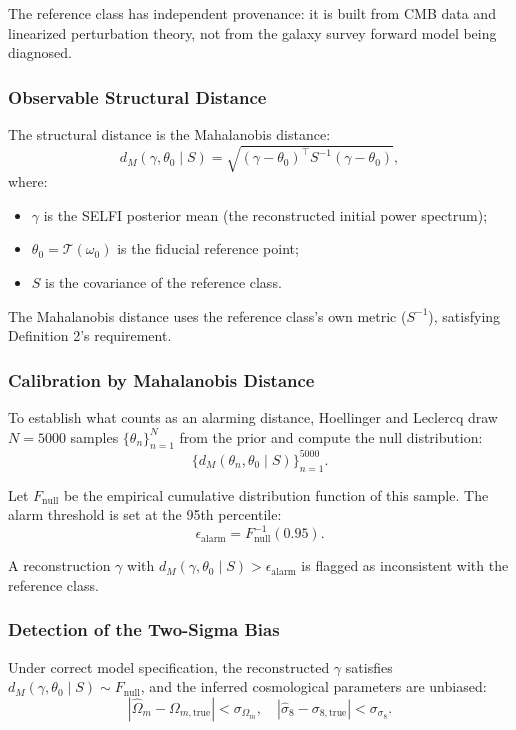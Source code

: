 The reference class has independent provenance: it is built from CMB data and linearized perturbation theory, not from the galaxy survey forward model being diagnosed.

\subsubsection{Observable Structural Distance}

The structural distance is the Mahalanobis distance:
\[
d_M(\gamma, \theta_0 \mid S) = \sqrt{(\gamma - \theta_0)^\top S^{-1} (\gamma - \theta_0)},
\]
where:
\begin{itemize}
\item $\gamma$ is the SELFI posterior mean (the reconstructed initial power spectrum);
\item $\theta_0 = \mathcal{T}(\omega_0)$ is the fiducial reference point;
\item $S$ is the covariance of the reference class.
\end{itemize}

The Mahalanobis distance uses the reference class's own metric ($S^{-1}$), satisfying Definition 2's requirement.

\subsubsection{Calibration by Mahalanobis Distance}

To establish what counts as an alarming distance, Hoellinger and Leclercq draw $N = 5000$ samples $\{\theta_n\}_{n=1}^N$ from the prior and compute the null distribution:
\[
\{d_M(\theta_n, \theta_0 \mid S)\}_{n=1}^{5000}.
\]

Let $F_{\mathrm{null}}$ be the empirical cumulative distribution function of this sample. The alarm threshold is set at the 95th percentile:
\[
\epsilon_{\mathrm{alarm}} = F_{\mathrm{null}}^{-1}(0.95).
\]

A reconstruction $\gamma$ with $d_M(\gamma, \theta_0 \mid S) > \epsilon_{\mathrm{alarm}}$ is flagged as inconsistent with the reference class.

\subsubsection{Detection of the Two-Sigma Bias}

Under correct model specification, the reconstructed $\gamma$ satisfies $d_M(\gamma, \theta_0 \mid S) \sim F_{\mathrm{null}}$, and the inferred cosmological parameters are unbiased:
\[
|\hat\Omega_m - \Omega_{m,\mathrm{true}}| < \sigma_{\Omega_m}, \quad |\hat\sigma_8 - \sigma_{8,\mathrm{true}}| < \sigma_{\sigma_8}.
\]

